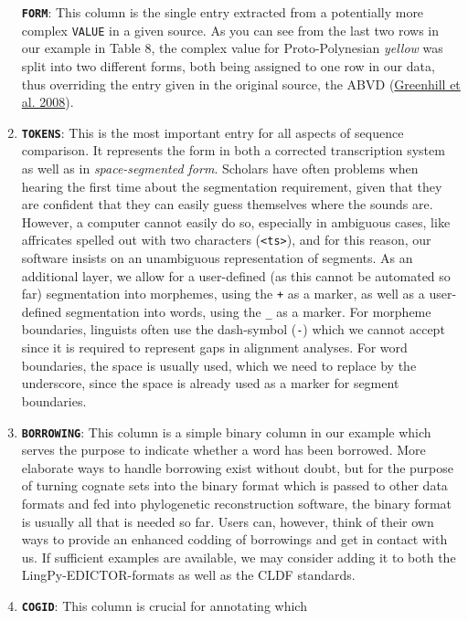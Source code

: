 \documentclass[a4paper,svgnames]{scrartcl}
\begin{document}
\begin{enumerate}
  \textbf{\texttt{FORM}}: This column is the single entry extracted from
  a potentially more complex \texttt{VALUE} in a given source. As you
  can see from the last two rows in our example in Table 8, the complex
  value for Proto-Polynesian \emph{yellow} was split into two different
  forms, both being assigned to one row in our data, thus overriding the
  entry given in the original source, the ABVD
  (\href{http://bibliography.lingpy.org?key=Greenhill2008}{Greenhill et
  al. 2008}).
\item
  \textbf{\texttt{TOKENS}}: This is the most important entry for all
  aspects of sequence comparison. It represents the form in both a
  corrected transcription system as well as in \emph{space-segmented
  form}. Scholars have often problems when hearing the first time about
  the segmentation requirement, given that they are confident that they
  can easily guess themselves where the sounds are. However, a computer
  cannot easily do so, especially in ambiguous cases, like affricates
  spelled out with two characters
  (\texttt{\textless{}ts\textgreater{}}), and for this reason, our
  software insists on an unambiguous representation of segments. As an
  additional layer, we allow for a user-defined (as this cannot be
  automated so far) segmentation into morphemes, using the \texttt{+} as
  a marker, as well as a user-defined segmentation into words, using the
  \texttt{\_} as a marker. For morpheme boundaries, linguists often use
  the dash-symbol (\texttt{-}) which we cannot accept since it is
  required to represent gaps in alignment analyses. For word boundaries,
  the space is usually used, which we need to replace by the underscore,
  since the space is already used as a marker for segment boundaries.
\item
  \textbf{\texttt{BORROWING}}: This column is a simple binary column in
  our example which serves the purpose to indicate whether a word has
  been borrowed. More elaborate ways to handle borrowing exist without
  doubt, but for the purpose of turning cognate sets into the binary
  format which is passed to other data formats and fed into phylogenetic
  reconstruction software, the binary format is usually all that is
  needed so far. Users can, however, think of their own ways to provide
  an enhanced codding of borrowings and get in contact with us. If
  sufficient examples are available, we may consider adding it to both
  the LingPy-EDICTOR-formats as well as the CLDF standards.
\item
  \textbf{\texttt{COGID}}: This column is crucial for annotating which

\end{enumerate}
\end{document}
